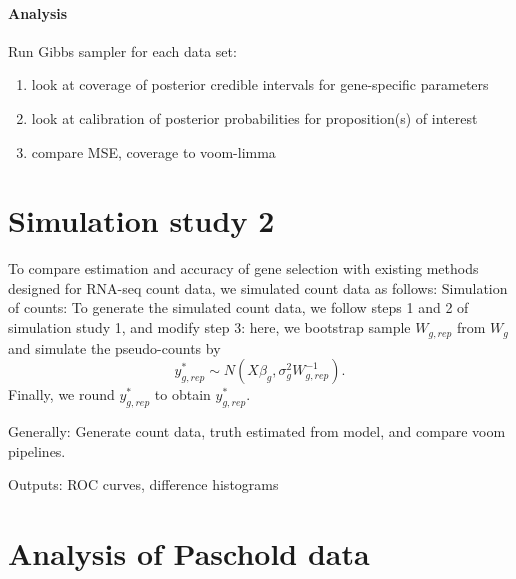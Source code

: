 \paragraph{Analysis}

Run Gibbs sampler for each data set:
\begin{enumerate}
\item look at coverage of posterior credible intervals for gene-specific parameters

\item look at calibration of posterior probabilities for proposition(s) of interest

\item compare MSE, coverage to voom-limma

\end{enumerate}

\section{Simulation study 2}
To compare estimation and accuracy of gene selection with existing methods designed for RNA-seq count data, we simulated count data as follows:
Simulation of counts:
To generate the simulated count data, we follow steps 1 and 2 of simulation study 1, and modify step 3: here, we bootstrap sample $W_{g,rep}$ from $W_g$ and simulate the pseudo-counts by
$$y^*_{g,rep} \sim N(X\beta_g,\sigma^2_gW_{g,rep}^{-1}).$$
Finally, we round $y^*_{g,rep}$ to obtain $y^*_{g,rep}$.




Generally: Generate count data, truth estimated from model, and compare voom pipelines.

Outputs: ROC curves, difference histograms

\section{Analysis of Paschold data}




